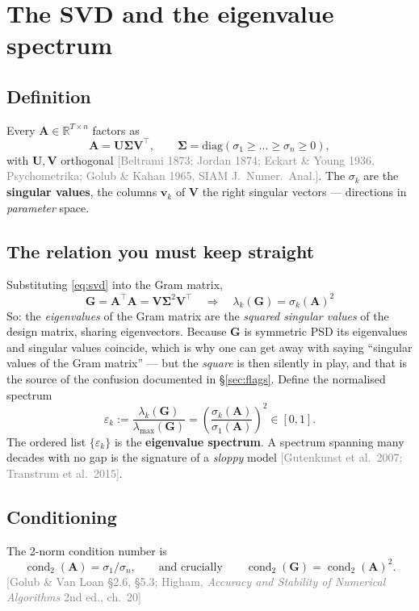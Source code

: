 \documentclass[11pt]{article}
\newcommand{\Mat}[1]{\mathbf{#1}}
\newcommand{\A}{\Mat{A}}
\DeclareMathOperator{\cond}{cond}
\newcommand{\eps}{\varepsilon}
\newcommand{\src}[1]{{\footnotesize\textcolor{gray}{[#1]}}}
\begin{document}
\section{The SVD and the eigenvalue spectrum}

\subsection{Definition}
Every $\A\in\mathbb R^{T\times n}$ factors as
\begin{equation}
\A = \Mat U \boldsymbol\Sigma \Mat V^{\!\top},\qquad
\boldsymbol\Sigma = \mathrm{diag}(\sigma_1 \ge \dots \ge \sigma_n \ge 0),
\label{eq:svd}
\end{equation}
with $\Mat U,\Mat V$ orthogonal \src{Beltrami 1873; Jordan 1874; Eckart \& Young
1936, Psychometrika; Golub \& Kahan 1965, SIAM J.~Numer.\ Anal.}. The $\sigma_k$
are the \textbf{singular values}, the columns $\Mat v_k$ of $\Mat V$ the right
singular vectors --- directions in \emph{parameter} space.

\subsection{The relation you must keep straight}
Substituting \eqref{eq:svd} into the Gram matrix,
\begin{equation}
\boxed{\;\Mat G = \A^{\!\top}\A = \Mat V\boldsymbol\Sigma^2\Mat V^{\!\top}
\quad\Longrightarrow\quad
\lambda_k(\Mat G) = \sigma_k(\A)^2 \;}
\label{eq:key}
\end{equation}
So: the \emph{eigenvalues} of the Gram matrix are the \emph{squared singular
values} of the design matrix, sharing eigenvectors. Because $\Mat G$ is
symmetric PSD its eigenvalues and singular values coincide, which is why one can
get away with saying ``singular values of the Gram matrix'' --- but the
\emph{square} is then silently in play, and that is the source of the confusion
documented in §\ref{sec:flags}. Define the normalised spectrum
\begin{equation}
\eps_k := \frac{\lambda_k(\Mat G)}{\lambda_{\max}(\Mat G)}
        = \left(\frac{\sigma_k(\A)}{\sigma_1(\A)}\right)^{\!2}
        \in [0,1].
\label{eq:relspec}
\end{equation}
The ordered list $\{\eps_k\}$ is the \textbf{eigenvalue spectrum}. A spectrum
spanning many decades with no gap is the signature of a \emph{sloppy} model
\src{Gutenkunst et al.\ 2007; Transtrum et al.\ 2015}.

\subsection{Conditioning}
The 2-norm condition number is
\begin{equation}
\cond_2(\A) = \sigma_1/\sigma_n, \qquad\text{and crucially}\qquad
\cond_2(\Mat G) = \cond_2(\A)^2 .
\label{eq:cond}
\end{equation}
\src{Golub \& Van Loan §2.6, §5.3; Higham, \emph{Accuracy and Stability of
Numerical Algorithms} 2nd ed., ch.~20}
\end{document}
